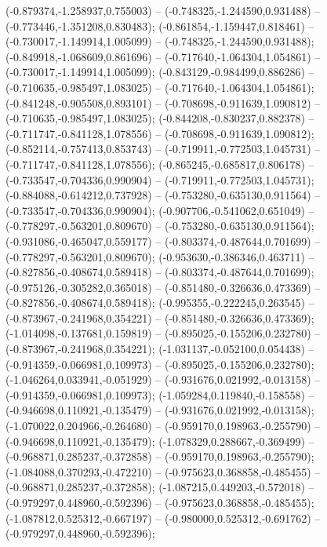  (-0.879374,-1.258937,0.755003) -- (-0.748325,-1.244590,0.931488) -- (-0.773446,-1.351208,0.830483);
 (-0.861854,-1.159447,0.818461) -- (-0.730017,-1.149914,1.005099) -- (-0.748325,-1.244590,0.931488);
 (-0.849918,-1.068609,0.861696) -- (-0.717640,-1.064304,1.054861) -- (-0.730017,-1.149914,1.005099);
 (-0.843129,-0.984499,0.886286) -- (-0.710635,-0.985497,1.083025) -- (-0.717640,-1.064304,1.054861);
 (-0.841248,-0.905508,0.893101) -- (-0.708698,-0.911639,1.090812) -- (-0.710635,-0.985497,1.083025);
 (-0.844208,-0.830237,0.882378) -- (-0.711747,-0.841128,1.078556) -- (-0.708698,-0.911639,1.090812);
 (-0.852114,-0.757413,0.853743) -- (-0.719911,-0.772503,1.045731) -- (-0.711747,-0.841128,1.078556);
 (-0.865245,-0.685817,0.806178) -- (-0.733547,-0.704336,0.990904) -- (-0.719911,-0.772503,1.045731);
 (-0.884088,-0.614212,0.737928) -- (-0.753280,-0.635130,0.911564) -- (-0.733547,-0.704336,0.990904);
 (-0.907706,-0.541062,0.651049) -- (-0.778297,-0.563201,0.809670) -- (-0.753280,-0.635130,0.911564);
 (-0.931086,-0.465047,0.559177) -- (-0.803374,-0.487644,0.701699) -- (-0.778297,-0.563201,0.809670);
 (-0.953630,-0.386346,0.463711) -- (-0.827856,-0.408674,0.589418) -- (-0.803374,-0.487644,0.701699);
 (-0.975126,-0.305282,0.365018) -- (-0.851480,-0.326636,0.473369) -- (-0.827856,-0.408674,0.589418);
 (-0.995355,-0.222245,0.263545) -- (-0.873967,-0.241968,0.354221) -- (-0.851480,-0.326636,0.473369);
 (-1.014098,-0.137681,0.159819) -- (-0.895025,-0.155206,0.232780) -- (-0.873967,-0.241968,0.354221);
 (-1.031137,-0.052100,0.054438) -- (-0.914359,-0.066981,0.109973) -- (-0.895025,-0.155206,0.232780);
 (-1.046264,0.033941,-0.051929) -- (-0.931676,0.021992,-0.013158) -- (-0.914359,-0.066981,0.109973);
 (-1.059284,0.119840,-0.158558) -- (-0.946698,0.110921,-0.135479) -- (-0.931676,0.021992,-0.013158);
 (-1.070022,0.204966,-0.264680) -- (-0.959170,0.198963,-0.255790) -- (-0.946698,0.110921,-0.135479);
 (-1.078329,0.288667,-0.369499) -- (-0.968871,0.285237,-0.372858) -- (-0.959170,0.198963,-0.255790);
 (-1.084088,0.370293,-0.472210) -- (-0.975623,0.368858,-0.485455) -- (-0.968871,0.285237,-0.372858);
 (-1.087215,0.449203,-0.572018) -- (-0.979297,0.448960,-0.592396) -- (-0.975623,0.368858,-0.485455);
 (-1.087812,0.525312,-0.667197) -- (-0.980000,0.525312,-0.691762) -- (-0.979297,0.448960,-0.592396);
